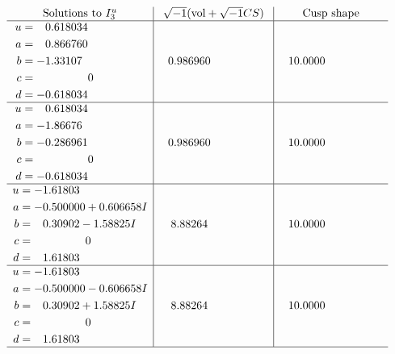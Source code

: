 \documentclass[1p]{elsarticle_modified}
\theoremstyle{definition}
\newcommand{\I}{\sqrt{-1}}
\begin{document}
$$\begin{array}{c|c|c}  
\text{Solutions to }I^u_{3}& \I (\text{vol} + \sqrt{-1}CS) & \text{Cusp shape}\\
 \hline 
\begin{aligned}
u &= \phantom{-}0.618034\phantom{ +0.000000I} \\
a &= \phantom{-}0.866760\phantom{ +0.000000I} \\
b &= -1.33107\phantom{ +0.000000I} \\
c &= \phantom{-0.000000 } 0 \\
d &= -0.618034\phantom{ +0.000000I}\end{aligned}
 & \phantom{-}0.986960\phantom{ +0.000000I} & \phantom{-}10.0000\phantom{ +0.000000I} \\ \hline\begin{aligned}
u &= \phantom{-}0.618034\phantom{ +0.000000I} \\
a &= -1.86676\phantom{ +0.000000I} \\
b &= -0.286961\phantom{ +0.000000I} \\
c &= \phantom{-0.000000 } 0 \\
d &= -0.618034\phantom{ +0.000000I}\end{aligned}
 & \phantom{-}0.986960\phantom{ +0.000000I} & \phantom{-}10.0000\phantom{ +0.000000I} \\ \hline\begin{aligned}
u &= -1.61803\phantom{ +0.000000I} \\
a &= -0.500000 + 0.606658 I \\
b &= \phantom{-}0.30902 - 1.58825 I \\
c &= \phantom{-0.000000 } 0 \\
d &= \phantom{-}1.61803\phantom{ +0.000000I}\end{aligned}
 & \phantom{-}8.88264\phantom{ +0.000000I} & \phantom{-}10.0000\phantom{ +0.000000I} \\ \hline\begin{aligned}
u &= -1.61803\phantom{ +0.000000I} \\
a &= -0.500000 - 0.606658 I \\
b &= \phantom{-}0.30902 + 1.58825 I \\
c &= \phantom{-0.000000 } 0 \\
d &= \phantom{-}1.61803\phantom{ +0.000000I}\end{aligned}
 & \phantom{-}8.88264\phantom{ +0.000000I} & \phantom{-}10.0000\phantom{ +0.000000I}\\
 \hline 
 \end{array}$$\newpage\newpage\renewcommand{\arraystretch}{1}
\end{document}
